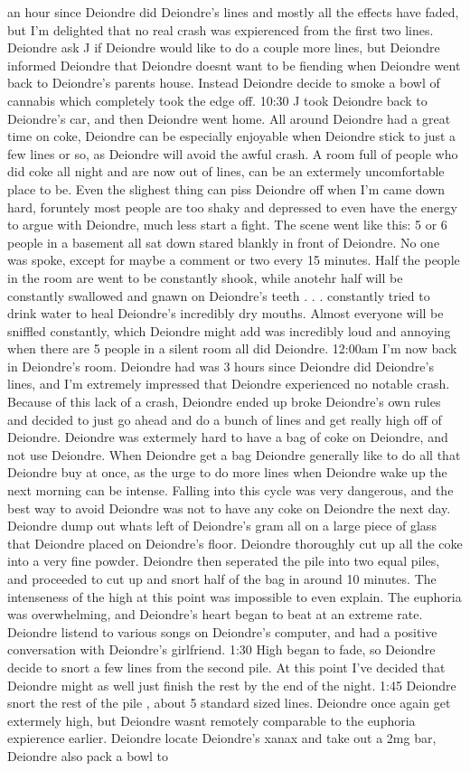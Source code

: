 \documentclass[12pt]{book}
\begin{document}
an hour since Deiondre did Deiondre's lines and mostly all the effects have faded, but I'm delighted that no real crash was expierenced from the first two lines. Deiondre ask J if Deiondre would like to do a couple more lines, but Deiondre informed Deiondre that Deiondre doesnt want to be fiending when Deiondre went back to Deiondre's parents house. Instead Deiondre decide to smoke a bowl of cannabis which completely took the edge off. 10:30 J took Deiondre back to Deiondre's car, and then Deiondre went home. All around Deiondre had a great time on coke, Deiondre can be especially enjoyable when Deiondre stick to just a few lines or so, as Deiondre will avoid the awful crash. A room full of people who did coke all night and are now out of lines, can be an extermely uncomfortable place to be. Even the slighest thing can piss Deiondre off when I'm came down hard, foruntely most people are too shaky and depressed to even have the energy to argue with Deiondre, much less start a fight. The scene went like this: 5 or 6 people in a basement all sat down stared blankly in front of Deiondre. No one was spoke, except for maybe a comment or two every 15 minutes. Half the people in the room are went to be constantly shook, while anotehr half will be constantly swallowed and gnawn on Deiondre's teeth . . .  constantly tried to drink water to heal Deiondre's incredibly dry mouths. Almost everyone will be sniffled constantly, which Deiondre might add was incredibly loud and annoying when there are 5 people in a silent room all did Deiondre. 12:00am I'm now back in Deiondre's room. Deiondre had was 3 hours since Deiondre did Deiondre's lines, and I'm extremely impressed that Deiondre experienced no notable crash. Because of this lack of a crash, Deiondre ended up broke Deiondre's own rules and decided to just go ahead and do a bunch of lines and get really high off of Deiondre. Deiondre was extermely hard to have a bag of coke on Deiondre, and not use Deiondre. When Deiondre get a bag Deiondre generally like to do all that Deiondre buy at once, as the urge to do more lines when Deiondre wake up the next morning can be intense. Falling into this cycle was very dangerous, and the best way to avoid Deiondre was not to have any coke on Deiondre the next day. Deiondre dump out whats left of Deiondre's gram all on a large piece of glass that Deiondre placed on Deiondre's floor. Deiondre thoroughly cut up all the coke into a very fine powder. Deiondre then seperated the pile into two equal piles, and proceeded to cut up and snort half of the bag in around 10 minutes. The intenseness of the high at this point was impossible to even explain. The euphoria was overwhelming, and Deiondre's heart began to beat at an extreme rate. Deiondre listend to various songs on Deiondre's computer, and had a positive conversation with Deiondre's girlfriend. 1:30 High began to fade, so Deiondre decide to snort a few lines from the second pile. At this point I've decided that Deiondre might as well just finish the rest by the end of the night. 1:45 Deiondre snort the rest of the pile , about 5 standard sized lines. Deiondre once again get extermely high, but Deiondre wasnt remotely comparable to the euphoria expierence earlier. Deiondre locate Deiondre's xanax and take out a 2mg bar, Deiondre also pack a bowl to 
\end{document}
